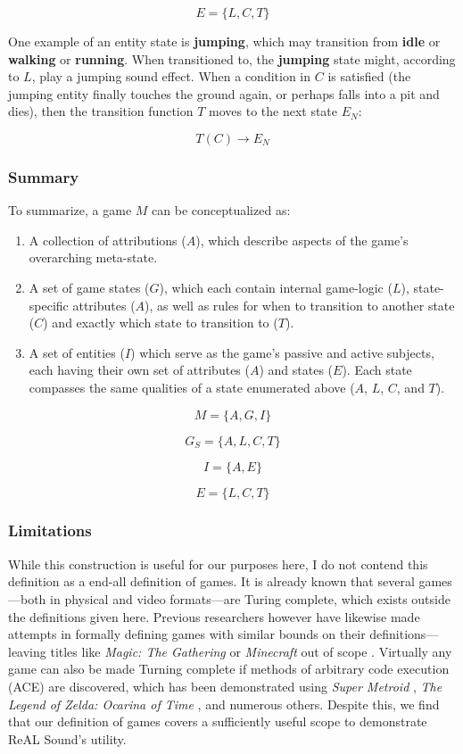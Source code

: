 \documentclass{report}
\newcommand{\rs}{ReAL Sound\xspace}
\begin{document}
$$E = \{L, C, T\}$$

One example of an entity state is \textbf{jumping}, which may transition from \textbf{idle} or \textbf{walking} or \textbf{running}. When transitioned to, the \textbf{jumping} state might, according to $L$, play a jumping sound effect. When a condition in $C$ is satisfied (the jumping entity finally touches the ground again, or perhaps falls into a pit and dies), then the transition function $T$ moves to the next state $E_N$:

$$T(C) \longrightarrow E_N$$

\subsubsection{Summary}
To summarize, a game $M$ can be conceptualized as:

\begin{enumerate}
    \item A collection of attributions ($A$), which describe aspects of the game's overarching meta-state.
    \item A set of game states ($G$), which each contain internal game-logic ($L$), state-specific attributes ($A$), as well as rules for when to transition to another state ($C$) and exactly which state to transition to ($T$).   
    \item A set of entities ($I$) which serve as the game's passive and active subjects, each having their own set of attributes ($A$) and states ($E$). Each state compasses the same qualities of a state enumerated above ($A$, $L$, $C$, and $T$).   
\end{enumerate}

$$
M = \{A, G, I\}
$$

$$
G_S = \{ A, L, C, T \}
$$

$$I = \{A, E\}$$

$$E = \{L, C, T\}$$


\subsubsection{Limitations}
While this construction is useful for our purposes here, I do not contend this definition as a end-all definition of games. It is already known that several games---both in physical and video formats---are Turing complete, which exists outside the definitions given here. Previous researchers however have likewise made attempts in formally defining games with similar bounds on their definitions---leaving titles like \emph{Magic: The Gathering} \cite{churchill2019magicgatheringturingcomplete} or \emph{Minecraft} \cite{Hildreth1980} out of scope \cite{Demaine}. Virtually any game can also be made Turning complete if methods of arbitrary code execution (ACE) are discovered, which has been demonstrated using \emph{Super Metroid} \cite{Mawhorter_Aytemiz_Karth_Smith_2021}, \emph{The Legend of Zelda: Ocarina of Time} \cite{OoT}, and numerous others. Despite this, we find that our definition of games covers a sufficiently useful scope to demonstrate \rs's utility.
\end{document}
